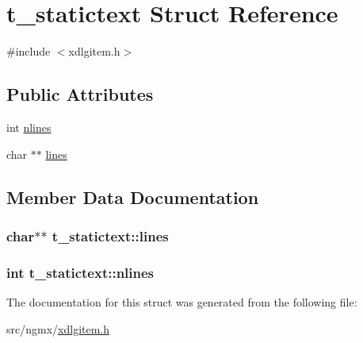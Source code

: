 \hypertarget{structt__statictext}{\section{t\-\_\-statictext \-Struct \-Reference}
\label{structt__statictext}
}


{\ttfamily \#include $<$xdlgitem.\-h$>$}

\subsection*{\-Public \-Attributes}
\begin{DoxyCompactItemize}
\item 
int \hyperlink{structt__statictext_afd6b89432769937254e104f4f21c1a91}{nlines}
\item 
char $\ast$$\ast$ \hyperlink{structt__statictext_a446e1fe92ec435695a78c4425f9642e4}{lines}
\end{DoxyCompactItemize}


\subsection{\-Member \-Data \-Documentation}
\hypertarget{structt__statictext_a446e1fe92ec435695a78c4425f9642e4}{
\subsubsection[{lines}]{\setlength{\rightskip}{0pt plus 5cm}char$\ast$$\ast$ {\bf t\-\_\-statictext\-::lines}}}\label{structt__statictext_a446e1fe92ec435695a78c4425f9642e4}
\hypertarget{structt__statictext_afd6b89432769937254e104f4f21c1a91}{
\subsubsection[{nlines}]{\setlength{\rightskip}{0pt plus 5cm}int {\bf t\-\_\-statictext\-::nlines}}}\label{structt__statictext_afd6b89432769937254e104f4f21c1a91}


\-The documentation for this struct was generated from the following file\-:\begin{DoxyCompactItemize}
\item 
src/ngmx/\hyperlink{xdlgitem_8h}{xdlgitem.\-h}\end{DoxyCompactItemize}
